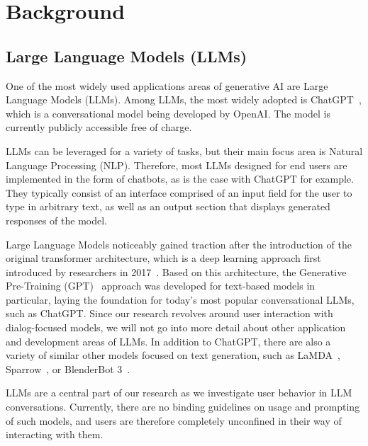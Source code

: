 \section{Background}
\label{sec:background}

\subsection{Large Language Models (LLMs)}
\label{subsec:large-language-models-(llms)}
One of the most widely used applications areas of generative AI are Large Language Models (LLMs).
Among LLMs, the most widely adopted is ChatGPT~\cite{openai_chatgpt_2023}, which is a
conversational model being developed by OpenAI\@.
The model is currently publicly accessible free of charge.

LLMs can be leveraged for a variety of tasks, but their main focus area is Natural Language Processing
(NLP).
Therefore, most LLMs designed for end users are implemented in the form of chatbots,
as is the case with ChatGPT for example.
They typically consist of an interface comprised of an input field for the user to type in arbitrary
text, as well as an output section that displays generated responses of the model.

Large Language Models noticeably gained traction after the introduction of the original transformer
architecture, which is a deep learning approach first introduced by researchers in 2017~\cite{vaswani_attention_2017}.
Based on this architecture, the Generative Pre-Training (GPT)~\cite{radford_improving_2018} approach
was developed for text-based models in particular, laying the foundation for today's most popular
conversational LLMs, such as ChatGPT\@.
Since our research revolves around user interaction with dialog-focused models, we will not go into
more detail about other application and development areas of LLMs.
In addition to ChatGPT, there are also a variety of similar other models focused on text generation,
such as LaMDA~\cite{thoppilan_lamda_2022}, Sparrow~\cite{glaese_improving_2022}, or
BlenderBot 3~\cite{shuster_blenderbot_2022}.


LLMs are a central part of our research as we investigate user behavior in LLM conversations.
Currently, there are no binding guidelines on usage and prompting of such models,
and users are therefore completely unconfined in their way of interacting with them.


